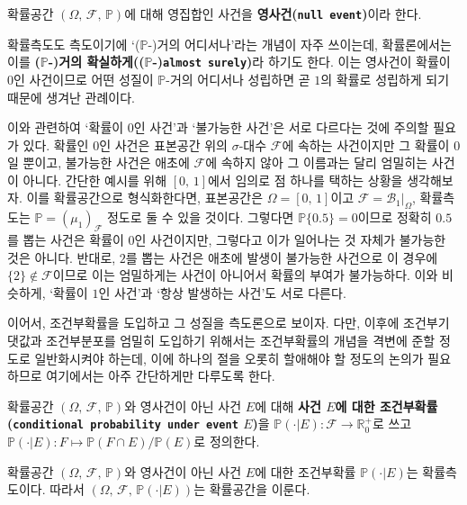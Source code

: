 \begin{definition}
    확률공간 $(\Omega,\,\mathcal{F},\,\mathbb{P})$에 대해 영집합인 사건을 \textbf{영사건(\texttt{null event})}이라 한다.
\end{definition}

확률측도도 측도이기에 `($\mathbb{P}$-)거의 어디서나'라는 개념이 자주 쓰이는데, 확률론에서는 이를 \textbf{($\mathbb{P}$-)거의 확실하게(($\mathbb{P}$-)\texttt{almost surely})}라 하기도 한다. 이는 영사건이 확률이 $0$인 사건이므로 어떤 성질이 $\mathbb{P}$-거의 어디서나 성립하면 곧 $1$의 확률로 성립하게 되기 때문에 생겨난 관례이다.

이와 관련하여 `확률이 $0$인 사건'과 `불가능한 사건'은 서로 다르다는 것에 주의할 필요가 있다. 확률인 $0$인 사건은 표본공간 위의 $\sigma$-대수 $\mathcal{F}$에 속하는 사건이지만 그 확률이 $0$일 뿐이고, 불가능한 사건은 애초에 $\mathcal{F}$에 속하지 않아 그 이름과는 달리 엄밀히는 사건이 아니다. 간단한 예시를 위해 $[0,\,1]$에서 임의로 점 하나를 택하는 상황을 생각해보자. 이를 확률공간으로 형식화한다면, 표본공간은 $\Omega=[0,\,1]$이고 $\mathcal{F}=\mathcal{B}_1\vert_\Omega$, 확률측도는 $\mathbb{P}=(\mu_1)_\mathcal{F}$ 정도로 둘 수 있을 것이다. 그렇다면 $\mathbb{P}\{0.5\}=0$이므로 정확히 $0.5$를 뽑는 사건은 확률이 $0$인 사건이지만, 그렇다고 이가 일어나는 것 자체가 불가능한 것은 아니다. 반대로, $2$를 뽑는 사건은 애초에 발생이 불가능한 사건으로 이 경우에 $\{2\}\notin\mathcal{F}$이므로 이는 엄밀하게는 사건이 아니어서 확률의 부여가 불가능하다. 이와 비슷하게, `확률이 $1$인 사건'과 `항상 발생하는 사건'도 서로 다른다.

이어서, 조건부확률을 도입하고 그 성질을 측도론으로 보이자. 다만, 이후에 조건부기댓값과 조건부분포를 엄밀히 도입하기 위해서는 조건부확률의 개념을 격변에 준할 정도로 일반화시켜야 하는데, 이에 하나의 절을 오롯히 할애해야 할 정도의 논의가 필요하므로 여기에서는 아주 간단하게만 다루도록 한다.

\begin{definition}
    확률공간 $(\Omega,\,\mathcal{F},\,\mathbb{P})$와 영사건이 아닌 사건 $E$에 대해 \textbf{사건 $E$에 대한 조건부확률(\texttt{conditional probability under event} $E$)}을  $\mathbb{P}(\cdot\vert E):\mathcal{F}\to\mathbb{R}^+_0$로 쓰고 $\mathbb{P}(\cdot\vert E):F\mapsto\mathbb{P}(F\cap E)/\mathbb{P}(E)$로 정의한다.
\end{definition}

\begin{proposition}
    확률공간 $(\Omega,\,\mathcal{F},\,\mathbb{P})$와 영사건이 아닌 사건 $E$에 대한 조건부확률 $\mathbb{P}(\cdot\vert E)$는 확률측도이다. 따라서 $(\Omega,\,\mathcal{F},\,\mathbb{P}(\cdot\vert E))$는 확률공간을 이룬다.
\end{proposition}


